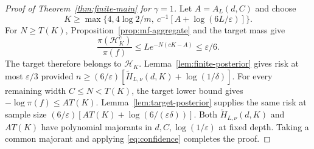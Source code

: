 \begin{proof}[Proof of Theorem~\ref{thm:finite-main} for $\gamma=1$]
Let $A=A_L(d,C)$ and choose
\[
 K\geq\max\{4,4\log2/m,\ c^{-1}[A+\log(6L/\varepsilon)]\}.
\]
For $N\geq T(K)$, Proposition~\ref{prop:mf-aggregate} and the target
mass give
\[
 \frac{\pi(\mathcal H_K^c)}{\pi(f)}
 \leq Le^{-N(cK-A)}\leq\varepsilon/6.
\]
The target therefore belongs to $\mathcal H_K$.
Lemma~\ref{lem:finite-posterior} gives risk at most $\varepsilon/3$
provided $n\geq(6/\varepsilon)[\widetilde H_{L,\nu}(d,K)+
\log(1/\delta)]$.
For every remaining width $C\leq N<T(K)$, the target lower bound gives
$-\log\pi(f)\leq AT(K)$. Lemma~\ref{lem:target-posterior} supplies
the same risk at sample size
$(6/\varepsilon)[AT(K)+\log(6/(\varepsilon\delta))]$.
Both $\widetilde H_{L,\nu}(d,K)$ and $AT(K)$ have polynomial
majorants in $d,C,\log(1/\varepsilon)$ at fixed depth. Taking a common
majorant and applying \eqref{eq:confidence} completes the proof.
\end{proof}
